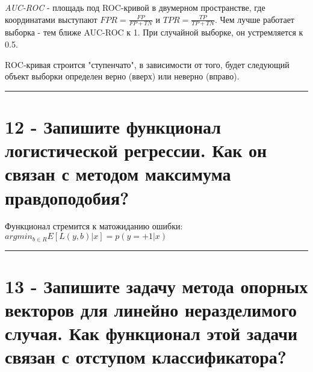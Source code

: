 \documentclass[11pt]{article}
\begin{document}
\emph{AUC-ROC} - площадь под ROC-кривой в двумерном пространстве, где
координатами выступают \(FPR = \frac{FP}{FP+TN}\) и
\(TPR = \frac{TP}{TP+TN}\). Чем лучше работает выборка - тем ближе
AUC-ROC к 1. При случайной выборке, он устремляется к 0.5.

ROC-кривая строится "ступенчато", в зависимости от того, будет следующий
объект выборки определен верно (вверх) или неверно (вправо).

    \begin{center}\rule{0.5\linewidth}{\linethickness}\end{center}

    \section{12 - Запишите функционал логистической регрессии. Как он связан
с методом максимума
правдоподобия?}\label{ux437ux430ux43fux438ux448ux438ux442ux435-ux444ux443ux43dux43aux446ux438ux43eux43dux430ux43b-ux43bux43eux433ux438ux441ux442ux438ux447ux435ux441ux43aux43eux439-ux440ux435ux433ux440ux435ux441ux441ux438ux438.-ux43aux430ux43a-ux43eux43d-ux441ux432ux44fux437ux430ux43d-ux441-ux43cux435ux442ux43eux434ux43eux43c-ux43cux430ux43aux441ux438ux43cux443ux43cux430-ux43fux440ux430ux432ux434ux43eux43fux43eux434ux43eux431ux438ux44f}

Функционал стремится к матожиданию ошибки:
\(arg min_{b∈R}E[L(y, b)| x] = p(y = +1 | x)\)

    \begin{center}\rule{0.5\linewidth}{\linethickness}\end{center}

    \section{13 - Запишите задачу метода опорных векторов для линейно
неразделимого случая. Как функционал этой задачи связан с отступом
классификатора?}\label{ux437ux430ux43fux438ux448ux438ux442ux435-ux437ux430ux434ux430ux447ux443-ux43cux435ux442ux43eux434ux430-ux43eux43fux43eux440ux43dux44bux445-ux432ux435ux43aux442ux43eux440ux43eux432-ux434ux43bux44f-ux43bux438ux43dux435ux439ux43dux43e-ux43dux435ux440ux430ux437ux434ux435ux43bux438ux43cux43eux433ux43e-ux441ux43bux443ux447ux430ux44f.-ux43aux430ux43a-ux444ux443ux43dux43aux446ux438ux43eux43dux430ux43b-ux44dux442ux43eux439-ux437ux430ux434ux430ux447ux438-ux441ux432ux44fux437ux430ux43d-ux441-ux43eux442ux441ux442ux443ux43fux43eux43c-ux43aux43bux430ux441ux441ux438ux444ux438ux43aux430ux442ux43eux440ux430}
\end{document}
